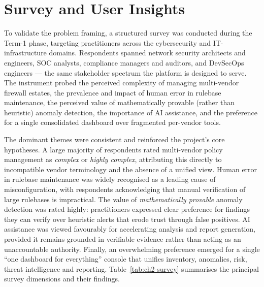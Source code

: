\documentclass[12pt,a4paper]{report}
\renewcommand{\_}{\textunderscore\allowbreak}
\begin{document}
\section{Survey and User Insights}
\label{sec:ch2-survey}
To validate the problem framing, a structured survey was conducted during the Term-1 phase, targeting practitioners across the cybersecurity and IT-infrastructure domains. Respondents spanned network security architects and engineers, SOC analysts, compliance managers and auditors, and DevSecOps engineers --- the same stakeholder spectrum the platform is designed to serve. The instrument probed the perceived complexity of managing multi-vendor firewall estates, the prevalence and impact of human error in rulebase maintenance, the perceived value of mathematically provable (rather than heuristic) anomaly detection, the importance of AI assistance, and the preference for a single consolidated dashboard over fragmented per-vendor tools.

The dominant themes were consistent and reinforced the project's core hypotheses. A large majority of respondents rated multi-vendor policy management as \emph{complex} or \emph{highly complex}, attributing this directly to incompatible vendor terminology and the absence of a unified view. Human error in rulebase maintenance was widely recognised as a leading cause of misconfiguration, with respondents acknowledging that manual verification of large rulebases is impractical. The value of \emph{mathematically provable} anomaly detection was rated highly: practitioners expressed clear preference for findings they can verify over heuristic alerts that erode trust through false positives. AI assistance was viewed favourably for accelerating analysis and report generation, provided it remains grounded in verifiable evidence rather than acting as an unaccountable authority. Finally, an overwhelming preference emerged for a single ``one dashboard for everything'' console that unifies inventory, anomalies, risk, threat intelligence and reporting. Table~\ref{tab:ch2-survey} summarises the principal survey dimensions and their findings.
\end{document}
